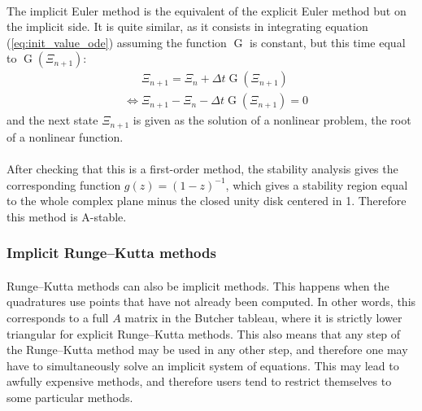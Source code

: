         \paragraph{}
        The implicit Euler method is the equivalent of the explicit Euler method but on the implicit side.
        It is quite similar, as it consists in integrating equation (\ref{eq:init_value_ode}) assuming the function $\operatorname{G}$ is constant, but this time equal to $\operatorname{G}\left(\Xi_{n+1}\right)$:
        \begin{equation}
          \begin{aligned}
            & \phantom{{} \Leftrightarrow {}} \Xi_{n+1} = \Xi_n + \Delta t \operatorname{G}\left(\Xi_{n+1}\right) \\
            &             \Leftrightarrow     \Xi_{n+1} - \Xi_n - \Delta t \operatorname{G}\left(\Xi_{n+1}\right) = 0
          \end{aligned}
        \end{equation}
        and the next state $\Xi_{n+1}$ is given as the solution of a nonlinear problem, the root of a nonlinear function.

        \paragraph{}
        After checking that this is a first-order method, the stability analysis gives the corresponding function $g\left(z\right) = \left(1 - z\right)^{-1}$, which gives a stability region equal to the whole complex plane minus the closed unity disk centered in 1.
        Therefore this method is A-stable.


      \subsubsection{Implicit Runge--Kutta methods}

        \paragraph{}
        Runge--Kutta methods can also be implicit methods.
        This happens when the quadratures use points that have not already been computed.
        In other words, this corresponds to a full $A$ matrix in the Butcher tableau, where it is strictly lower triangular for explicit Runge--Kutta methods.
        This also means that any step of the Runge--Kutta method may be used in any other step, and therefore one may have to simultaneously solve an implicit system of equations.
        This may lead to awfully expensive methods, and therefore users tend to restrict themselves to some particular methods.

